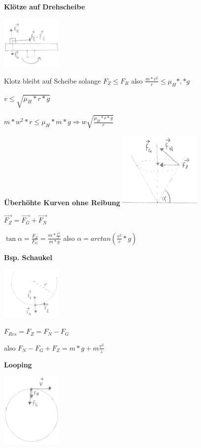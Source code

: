 \documentclass[a4paper,9pt]{article}
\begin{document}
\begin{multicols}{4}
	\textbf{Klötze auf Drehscheibe}
	
	\includegraphics[width=3cm]{gr4}
	
	Klotz bleibt auf Scheibe solange $ F_Z \le F_R $ also $ \frac{m * v^2}{r} \le \mu_H * , * g $
	
	$ v \le \sqrt{\mu_H * r * g} $
	
	$ m * w^2 * r \le \mu_H * m * g \Rightarrow w \sqrt{\frac{\mu_H * r *g}{r}} $
	
	\textbf{Überhöhte Kurven ohne Reibung}
	\includegraphics[width=4cm]{gr5}
	
	$ \vec{F_Z}  = \vec{F_G} + \vec{F_N} $
	
	$ \tan{\alpha} = \frac{F_Z}{F_G} = \frac{m*\frac{v^2}{r}}{m*g} $ also $ \alpha = arctan(\frac{v^2}{r} *g) $  
	
	\textbf{Bsp. Schaukel}
	
	\includegraphics[width=3cm]{gr6}
	
	$ F_{Res} = F_Z = F_N - F_G  $
	
	also $ F_N - F_G + F_Z = m * g + m\frac{v^2}{z} $
	
	\textbf{Looping}
	
	\includegraphics[width=3cm]{gr7}
	

\end{multicols}
\end{document}
